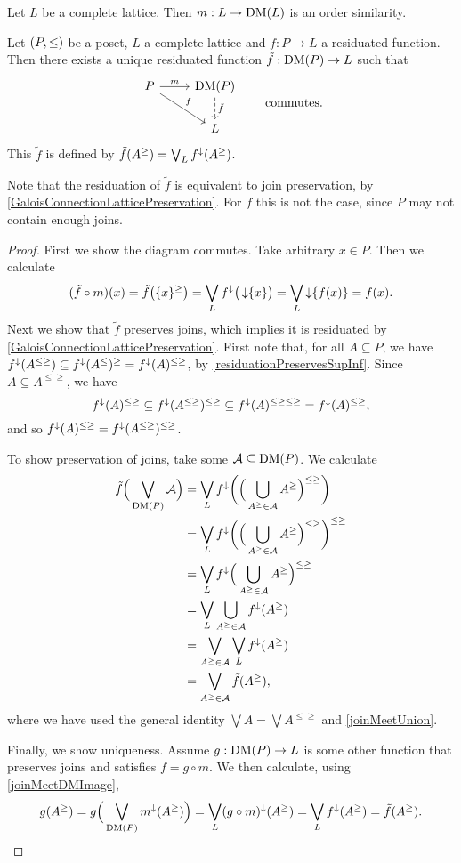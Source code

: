 \begin{lemma}
Let $L$ be a complete lattice. Then $m: L\to \operatorname{DM}(L)$ is an order similarity.
\end{lemma}

\begin{proposition}
Let $\sSet{P, \leq}$ be a poset, $L$ a complete lattice and $f: P\to L$ a residuated function. Then there exists a unique residuated function $\tilde{f}: \operatorname{DM}(P) \to L$ such that
\[ \begin{tikzcd}
P \ar[r, "m"] \ar[dr, "f"] & \DM(P) \ar[d, dashed, "{\tilde{f}}"] \\
{} & L
\end{tikzcd} \qquad \text{commutes.} \]
This $\tilde{f}$ is defined by $\tilde{f}(A^\geq) = \bigvee_L f^\downarrow(A^\geq)$.
\end{proposition}
Note that the residuation of $\tilde{f}$ is equivalent to join preservation, by \ref{GaloisConnectionLatticePreservation}. For $f$ this is not the case, since $P$ may not contain enough joins.
\begin{proof}
First we show the diagram commutes. Take arbitrary $x\in P$. Then we calculate
\[ (\tilde{f}\circ m)(x) = \tilde{f}\big(\{x\}^\geq\big) = \bigvee_L f^\downarrow\big(\operatorname{\downarrow}\{x\}\big) = \bigvee_L \operatorname{\downarrow}\{f(x)\} = f(x). \]
Next we show that $\tilde{f}$ preserves joins, which implies it is residuated by \ref{GaloisConnectionLatticePreservation}. First note that, for all $A\subseteq P$, we have $f^\downarrow(A^{\leq \geq}) \subseteq f^\downarrow(A^\leq)^\geq = f^\downarrow(A)^{\leq\geq}$, by \ref{residuationPreservesSupInf}. Since $A\subseteq A^{\leq\geq}$, we have
\[ f^\downarrow(A)^{\leq\geq} \subseteq f^\downarrow(A^{\leq \geq})^{\leq\geq} \subseteq f^\downarrow(A)^{\leq\geq\leq\geq} = f^\downarrow(A)^{\leq\geq}, \]
and so $f^\downarrow(A)^{\leq\geq} = f^\downarrow(A^{\leq \geq})^{\leq\geq}$.

To show preservation of joins, take some $\mathcal{A}\subseteq \operatorname{DM}(P)$. We calculate
\begin{align*}
\tilde{f}\Big(\bigvee_{\operatorname{DM}(P)}\mathcal{A}\Big) &= \bigvee_Lf^\downarrow\bigg(\Big(\bigcup_{A^\geq \in \mathcal{A}}A^\geq\Big)^{\leq\geq}\bigg) \\
&= \bigvee_Lf^\downarrow\bigg(\Big(\bigcup_{A^\geq \in \mathcal{A}}A^\geq\Big)^{\leq\geq}\bigg)^{\leq\geq} \\
&= \bigvee_Lf^\downarrow\Big(\bigcup_{A^\geq \in \mathcal{A}}A^\geq\Big)^{\leq\geq} \\
&= \bigvee_L\bigcup_{A^\geq \in \mathcal{A}} f^\downarrow(A^\geq) \\
&= \bigvee_{A^\geq \in \mathcal{A}}\bigvee_L f^\downarrow(A^\geq) \\
&= \bigvee_{A^\geq \in \mathcal{A}}\tilde{f}(A^\geq),
\end{align*}
where we have used the general identity $\bigvee A = \bigvee A^{\leq\geq}$ and \ref{joinMeetUnion}.

Finally, we show uniqueness. Assume $g: \operatorname{DM}(P)\to L$ is some other function that preserves joins and satisfies $f = g\circ m$. We then calculate, using \ref{joinMeetDMImage},
\[ g(A^\geq) = g\Big(\bigvee_{\operatorname{DM}(P)}m^\downarrow(A^\geq)\Big) = \bigvee_L (g\circ m)^\downarrow(A^\geq) = \bigvee_L f^\downarrow(A^\geq) = \tilde{f}(A^\geq). \]
\end{proof}


